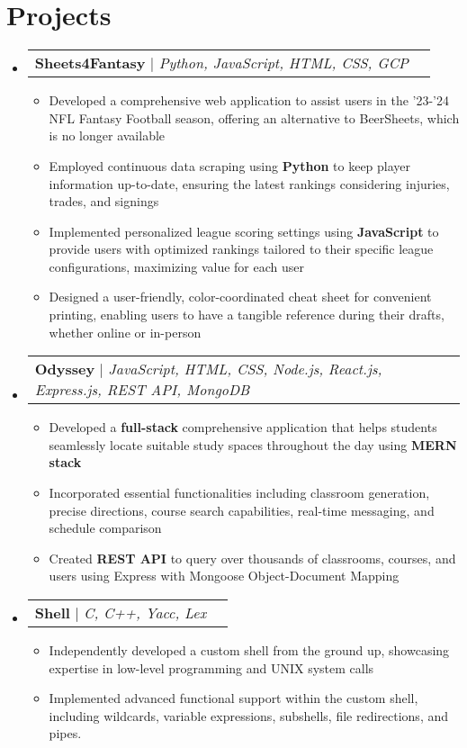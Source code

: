 \documentclass[letterpaper,11pt]{article}
\makeatletter
\newcommand{\resumeItem}[1]{
  \item\small{
    {#1 \vspace{-2pt}}
  }
}
\newcommand{\resumeProjectHeading}[2]{
    \item
    \begin{tabular*}{0.97\textwidth}{l@{\extracolsep{\fill}}r}
      \small#1 & #2 \\
    \end{tabular*}\vspace{-7pt}
}
\newcommand{\resumeSubHeadingListStart}{\begin{itemize}[leftmargin=0.15in, label={}]}
\newcommand{\resumeSubHeadingListEnd}{\end{itemize}}
\newcommand{\resumeItemListStart}{\begin{itemize}}
\newcommand{\resumeItemListEnd}{\end{itemize}\vspace{-5pt}}
\makeatother
\begin{document}
\section{Projects}
    \resumeSubHeadingListStart
      \resumeProjectHeading
          {\textbf{Sheets4Fantasy} $|$ \emph{Python, JavaScript, HTML, CSS, GCP}}{}
          \resumeItemListStart
            \resumeItem{Developed a comprehensive web application to assist users in the '23-'24 NFL Fantasy Football season, offering an alternative to BeerSheets, which is no longer available}
            \resumeItem{Employed continuous data scraping using \textbf{Python} to keep player information up-to-date, ensuring the latest rankings considering injuries, trades, and signings}
            \resumeItem{Implemented personalized league scoring settings using \textbf{JavaScript} to provide users with optimized rankings tailored to their specific league configurations, maximizing value for each user}
            \resumeItem{Designed a user-friendly, color-coordinated cheat sheet for convenient printing, enabling users to have a tangible reference during their drafts, whether online or in-person}
          \resumeItemListEnd
      \resumeProjectHeading
          {\textbf{Odyssey} $|$ \emph{JavaScript, HTML, CSS, Node.js, React.js, Express.js, REST API, MongoDB}}{}
          \resumeItemListStart
            \resumeItem{Developed a \textbf{full-stack} comprehensive application that helps students seamlessly locate suitable study spaces throughout the day using \textbf{MERN stack}}
            \resumeItem{Incorporated essential functionalities including classroom generation, precise directions, course search capabilities, real-time messaging, and schedule comparison}
            \resumeItem{Created \textbf{REST API} to query over thousands of classrooms, courses, and users using Express with Mongoose Object-Document Mapping}
          \resumeItemListEnd
      \resumeProjectHeading
          {\textbf{Shell} $|$ \emph{C, C++, Yacc, Lex}}{}
          \resumeItemListStart
            \resumeItem{Independently developed a custom shell from the ground up, showcasing expertise in low-level programming and UNIX system calls}
            \resumeItem{Implemented advanced functional support within the custom shell, including wildcards, variable expressions, subshells, file redirections, and pipes.}
          \resumeItemListEnd
    \resumeSubHeadingListEnd
\end{document}
